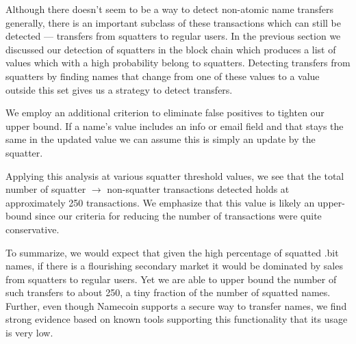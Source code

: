 Although there doesn't seem to be a way to detect non-atomic name transfers generally, there is an important subclass of these transactions which can still be detected --- transfers from squatters to regular users. In the previous section we discussed our detection of squatters in the block chain which produces a list of values which with a high probability belong to squatters. Detecting transfers from squatters by finding names that change from one of these values to a value outside this set gives us a strategy to detect transfers.

We employ an additional criterion to eliminate false positives to tighten our upper bound. 
If a name's value includes an info or email field and that stays the same in the updated value we can assume this is simply an update by the squatter. 


Applying this analysis at various squatter threshold values, we see that the total number of squatter $\rightarrow$ non-squatter transactions detected holds at approximately 250 transactions. We emphasize that this value is likely an upper-bound since our criteria for reducing the number of transactions were quite conservative. 

To summarize, we would expect that given the high percentage of squatted .bit names, if there is a flourishing secondary market it would be dominated by sales from squatters to regular users. Yet we are able to upper bound the number of such transfers to about 250, a tiny fraction of the number of squatted names. Further, even though Namecoin supports a secure way to transfer names, we find strong evidence based on known tools supporting this functionality that its usage is very low.
